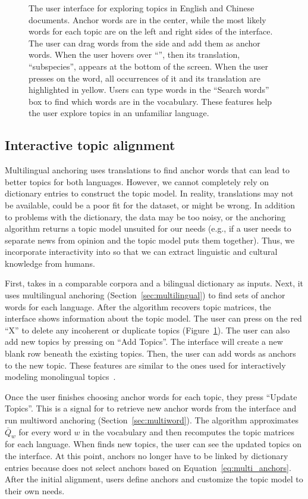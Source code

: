 \begin{figure}
  \centering
  \caption{The user interface for exploring topics in English and Chinese documents.  Anchor words are in the center, while the most likely words for each topic are on the left and right sides of the interface.  The user can drag words from the side and add them as anchor words.  When the user hovers over ``'', then its translation, ``subspecies'', appears at the bottom of the screen.  When the user presses on the word, all occurrences of it and its translation are highlighted in yellow. Users can type words in the ``Search words'' box to find which words are in the vocabulary.  These features help the user explore topics in an unfamiliar language.}
  \label{fig:ui}
\end{figure}

\subsection{Interactive topic alignment}
\label{sec:interface}

Multilingual anchoring uses translations to find anchor words that
can lead to better topics for both languages.  However, we cannot
completely rely on dictionary entries to construct the topic model.
In reality, translations may not be available, could
be a poor fit for the dataset, or might be wrong.  In
addition to problems with the dictionary, the data may be too noisy,
or the anchoring algorithm returns a topic model unsuited for our
needs (e.g., if a user needs to separate news from opinion and the
topic model puts them together).  Thus, we incorporate interactivity
into \mtanchor so that we can extract linguistic and cultural
knowledge from humans.

First, \mtanchor takes in a comparable corpora and a bilingual dictionary as inputs.  Next, it uses multilingual anchoring
(Section~\ref{sec:multilingual}) to find sets of anchor words for
each language. After the algorithm recovers topic matrices, the
interface shows information about the topic model.  The user can press on the red ``X'' to delete any incoherent or duplicate topics (Figure~\ref{fig:ui}). The user can also add new topics by pressing on ``Add Topics''.  The interface will create a new blank row beneath the existing topics.  Then, the user can add words as anchors to the new topic.  These features are similar to the ones used for interactively modeling monolingual topics~\cite{lund-2017}.


Once the user finishes choosing anchor words for each topic, they press ``Update Topics''.  This is a signal for \mtanchor to retrieve new anchor words from the interface and run multiword anchoring
(Section~\ref{sec:multiword}).  The algorithm approximates~$\bar{Q}_w$ for every word $w$ in the vocabulary and then recomputes the topic matrices for each language.  When \mtanchor finds new topics, the user can see the updated topics on the interface.  At this point, anchors no longer have to be linked by dictionary entries because \mtanchor does not select anchors based on Equation~\ref{eq:multi_anchors}. After the initial alignment, users define anchors and customize the topic model to their own needs.  


